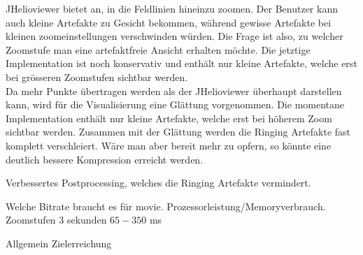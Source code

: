 JHelioviewer bietet an, in die Feldlinien hineinzu zoomen. Der Benutzer kann auch kleine Artefakte zu Gesicht bekommen, während gewisse Artefakte bei kleinen zoomeinstellungen verschwinden würden. Die Frage ist also, zu welcher Zoomstufe man eine artefaktfreie Ansicht erhalten möchte. Die jetztige Implementation ist noch konservativ und enthält nur kleine Artefakte, welche erst bei grösseren Zoomstufen sichtbar werden.\\
Da mehr Punkte übertragen werden als der JHelioviewer überhaupt darstellen kann, wird für die Visualisierung eine Glättung vorgenommen. Die momentane Implementation enthält nur kleine Artefakte, welche erst bei höherem Zoom sichtbar werden. Zusammen mit der Glättung werden die Ringing Artefakte fast komplett verschleiert. Wäre man aber bereit mehr zu opfern, so könnte eine deutlich bessere Kompression erreicht werden.

Verbessertes Postprocessing, welches die Ringing Artefakte vermindert.

Welche Bitrate braucht es für movie. Prozessorleistung/Memoryverbrauch. Zoomstufen
3 sekunden
$65-350$ ms

Allgemein Zielerreichung
